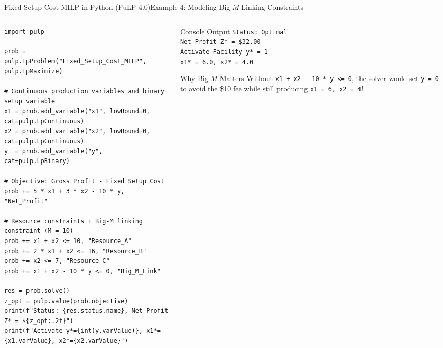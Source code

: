 \documentclass[aspectratio=169]{beamer}
\begin{document}
\begin{frame}[fragile]{Fixed Setup Cost MILP in Python (PuLP 4.0)}{Example 4: Modeling Big-$M$ Linking Constraints}
\begin{columns}[T]
\begin{column}{0.58\textwidth}
\begin{lstlisting}
import pulp

prob = pulp.LpProblem("Fixed_Setup_Cost_MILP", pulp.LpMaximize)

# Continuous production variables and binary setup variable
x1 = prob.add_variable("x1", lowBound=0, cat=pulp.LpContinuous)
x2 = prob.add_variable("x2", lowBound=0, cat=pulp.LpContinuous)
y  = prob.add_variable("y", cat=pulp.LpBinary)

# Objective: Gross Profit - Fixed Setup Cost
prob += 5 * x1 + 3 * x2 - 10 * y, "Net_Profit"

# Resource constraints + Big-M linking constraint (M = 10)
prob += x1 + x2 <= 10, "Resource_A"
prob += 2 * x1 + x2 <= 16, "Resource_B"
prob += x2 <= 7, "Resource_C"
prob += x1 + x2 - 10 * y <= 0, "Big_M_Link"

res = prob.solve()
z_opt = pulp.value(prob.objective)
print(f"Status: {res.status.name}, Net Profit Z* = ${z_opt:.2f}")
print(f"Activate y*={int(y.varValue)}, x1*={x1.varValue}, x2*={x2.varValue}")
\end{lstlisting}
\end{column}
\begin{column}{0.39\textwidth}
\begin{block}{Console Output}
\footnotesize
\texttt{Status: Optimal}\\
\texttt{Net Profit Z* = \$32.00}\\
\texttt{Activate Facility y* = 1}\\
\texttt{x1* = 6.0, x2* = 4.0}
\end{block}
\begin{alertblock}{Why Big-$M$ Matters}
\scriptsize
Without \texttt{x1 + x2 - 10 * y <= 0}, the solver would set \texttt{y = 0} to avoid the \$10 fee while still producing \texttt{x1 = 6, x2 = 4}!
\end{alertblock}
\end{column}
\end{columns}
\end{frame}
\end{document}
